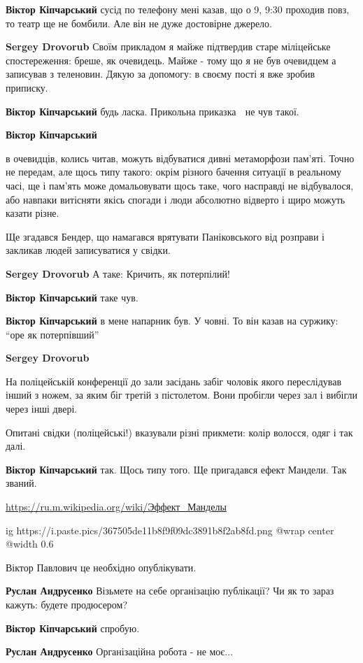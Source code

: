 \begin{itemize}
\textbf{Віктор Кіпчарський} сусід по телефону мені казав, що о 9, 9:30 проходив повз, то театр ще не бомбили. Але він не дуже достовірне джерело.

\textbf{Sergey Drovorub} Своїм прикладом я майже підтвердив старе міліцейське спостереження: бреше, як очевидець.
Майже - тому що я не був очевидцем а записував з теленовин.
Дякую за допомогу: в своєму пості я вже зробив приписку.

\textbf{Віктор Кіпчарський} будь ласка.
Прикольна приказка 🙂 не чув такої.

\textbf{Віктор Кіпчарський} 

в очевидців, колись читав, можуть відбуватися дивні метаморфози пам'яті. Точно
не передам, але щось типу такого: окрім різного бачення ситуації в реальному
часі, ще і пам'ять може домальовувати щось таке, чого насправді не відбувалося,
або навпаки витісняти якісь спогади і люди абсолютно відверто і щиро можуть
казати різне.

Ще згадався Бендер, що намагався врятувати Паніковського від розправи і
закликав людей записуватися у свідки. 🙂

\textbf{Sergey Drovorub} А таке:
Кричить, як потерпілий!

\textbf{Віктор Кіпчарський} таке чув.

\textbf{Віктор Кіпчарський} в мене напарник був. У човні. То він казав на суржику: \enquote{оре як потерпівший} 🙂

\textbf{Sergey Drovorub} 

На поліцейській конференції до зали засідань забіг чоловік якого переслідував
інший з ножем, за яким біг третій з пістолетом. Вони пробігли через зал і
вибігли через інші двері.

Опитані свідки (поліцейські!) вказували різні прикмети: колір волосся, одяг і так далі.

\textbf{Віктор Кіпчарський} так. Щось типу того. Ще пригадався ефект Мандели. Так званий.


\url{https://ru.m.wikipedia.org/wiki/Эффект_Манделы}

\ifcmt
  ig https://i.paste.pics/367505de11b8f9f09dc3891b8f2ab8fd.png
  @wrap center
  @width 0.6
\fi

\end{itemize} %

Віктор Павлович це необхідно опублікувати.

\begin{itemize} %
\textbf{Руслан Андрусенко} Візьмете на себе організацію публікації?
Чи як то зараз кажуть: будете продюсером?

\textbf{Віктор Кіпчарський} спробую.

\textbf{Руслан Андрусенко} Організаційна робота - не моє...

\end{itemize} %
